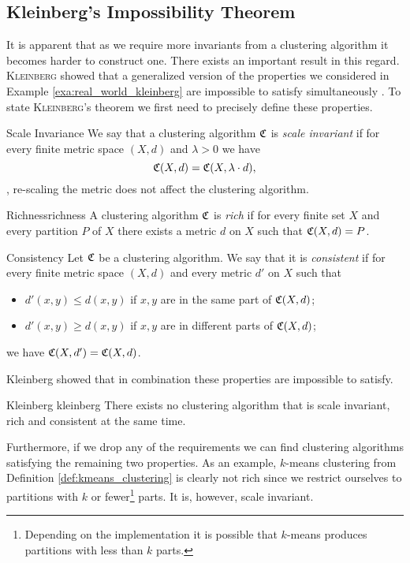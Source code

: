 \subsection{Kleinberg's Impossibility Theorem}
It is apparent that as we require more invariants from a clustering algorithm it becomes harder to construct one.
There exists an important result in this regard.
\textsc{Kleinberg} showed that a generalized version of the properties we considered in Example \ref{exa:real_world_kleinberg} are impossible to satisfy simultaneously \cite{Kleinberg2002}.
To state \textsc{Kleinberg}'s theorem we first need to precisely define these properties.

\begin{definition}{Scale Invariance}{}
We say that a clustering algorithm $\mathfrak{C}$ is \emph{scale invariant} if for every finite metric space $(X,d)$ and $\lambda > 0$ we have
$$
\mathfrak{C}(X,d) = \mathfrak{C}(X, \lambda \cdot d),
$$
\ie, re-scaling the metric does not affect the clustering algorithm.
\end{definition}

\begin{definition}{Richness}{richness}
A clustering algorithm $\mathfrak{C}$ is \emph{rich} if for every finite set $X$ and every partition $P$ of $X$ there exists a metric $d$ on $X$ such that $\mathfrak{C}(X,d) = P$.
\end{definition}

\begin{definition}{Consistency}{}
Let $\mathfrak{C}$ be a clustering algorithm. We say that it is \emph{consistent} if for every finite metric space $(X,d)$ and every metric $d'$ on $X$ such that
\begin{itemize}
    \item $d'(x,y) \leq d(x,y)$ if $x,y$ are in the same part of $\mathfrak{C}(X,d)$;
    \item $d'(x,y) \geq d(x,y)$ if $x,y$ are in different parts of $\mathfrak{C}(X,d)$;
\end{itemize}
we have $\mathfrak{C}(X,d') = \mathfrak{C}(X,d)$.
\end{definition}

Kleinberg showed that in combination these properties are impossible to satisfy.

\begin{theorem}{Kleinberg \cite[Thm.~2.1]{Kleinberg2002}}{kleinberg}
There exists no clustering algorithm that is scale invariant, rich and consistent at the same time.
\end{theorem}

Furthermore, if we drop any of the requirements we can find clustering algorithms satisfying the remaining two properties. As an example, $k$-means clustering from Definition \ref{def:kmeans_clustering} is clearly not rich since we restrict ourselves to partitions with $k$ or fewer\footnote{Depending on the implementation it is possible that $k$-means produces partitions with less than $k$ parts.} parts. It is, however, scale invariant.